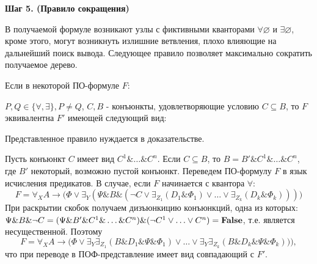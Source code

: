 \documentclass[a4paper]{jctart15b}
\begin{document}
\textbf{Шаг 5. (Правило сокращения)}

В получаемой формуле возникают узлы с фиктивными кванторами $\forall\varnothing$ и $\exists\varnothing$, кроме этого, могут возникнуть излишние ветвления, плохо влияющие на дальнейший поиск вывода. Следующее правило позволяет максимально сократить получаемое дерево.

Если в некоторой ПО-формуле $F$:
\begin{center}
\end{center}
$P,Q\in\{\forall,\exists\}, P\neq Q$, $C,B$ - конъюнкты, удовлетворяющие условию $C\subseteq B$, то $F$ эквивалентна $F'$ имеющей следующий вид:

\begin{center}
\end{center}

Представленное правило нуждается в доказательстве.

Пусть конъюнкт $C$ имеет вид $C^1\&\ldots\& C^n$. Если $C\subseteq B$, то $B = B'\&C^1\&\ldots\& C^n$, где $B'$ некоторый, возможно пустой конъюнкт. Переведем ПО-формулу $F$ в язык исчисления предикатов. В случае, если $F$ начинается с квантора $\forall$:
$$F = \forall_X A\rightarrow\bigl(\Phi\vee\exists_Y(\Psi\& B\&(\neg C\vee\exists_{Z_1}(D_1\&\Phi_1)\vee\ldots\vee\exists_{Z_k}(D_k\&\Phi_k)))\bigr)$$
При раскрытии скобок получаем дизъюнкицию конъюнкций, одна из которых: $\Psi\&B\&\neg C = (\Psi\&B'\&C^1\&\ldots\& C^n)\&(\neg C^1\vee\ldots\vee C^n) = \text{\textbf{False}}$, т.е. является несущественной. Поэтому
$$F = \forall_X A\rightarrow\bigl(\Phi\vee\exists_Y\exists_{Z_1}(B\&D_1\&\Psi\&\Phi_1)\vee\ldots\vee\exists_Y\exists_{Z_k}(B\&D_k\&\Psi\&\Phi_k))\bigr),$$
что при переводе в ПОФ-представление имеет вид совпадающий с $F'$.
\end{document}
